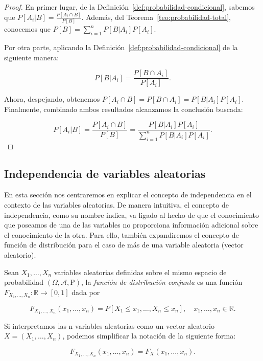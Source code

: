 \begin{proof}
    En primer lugar, de la Definición~\ref{def:probabilidad-condicional}, sabemos que
     $P[A_i|B] = \frac{P[A_i \cap B]}{P[B]}$. Además, del Teorema~\ref{teo:probabilidad-total}, conocemos que $P[B] = \sum_{i=1}^n P[B|A_i]P[A_i]$.\newline

    Por otra parte, aplicando la Definición~\ref{def:probabilidad-condicional} de la siguiente manera:

    \[ P[B|A_i] = \frac{P[B \cap A_i]}{P[A_i]}. \]\newline

    Ahora, despejando, obtenemos $P[A_i \cap B] = P[B \cap A_i] = P[B|A_i]{P[A_i]}$. Finalmente, combinado ambos resultados alcanzamos la conclusión buscada:

    \[ P[A_i|B] = \frac{P[A_i \cap B]}{P[B]} = \frac{P[B | A_i]P[A_i]}{\sum_{i=1}^n P[B|A_i]P[A_i]}. \]
    
\end{proof}

\subsection{Independencia de variables aleatorias}

En esta sección nos centraremos en explicar el concepto de independencia en el contexto de las variables aleatorias. De manera intuitiva, el concepto de independencia, como su nombre indica, va ligado al hecho de que el conocimiento que poseamos de una de las variables no proporciona información adicional sobre el conocimiento de la otra. Para ello, también expandiremos el concepto de función de distribución para el caso de más de una variable aleatoria (vector aleatorio).\newline

\begin{definicion}\label{def:funcion-de-distribucion-conjunta}
    Sean $X_1, \ldots, X_n$ variables aleatorias definidas sobre el mismo espacio de probabilidad $(\Omega, \mathcal{A}, \mathrm{P})$, la \emph{función de distribución conjunta} es una función $F_{X_{1}, \ldots, X_{n}}: \mathbb{R} \to [0,1]$ dada por

    \[ F_{X_{1}, \ldots, X_{n}}(x_1, \ldots, x_n) = P[X_1 \leq x_1, \ldots, X_n \leq x_n], \quad x_1, \ldots, x_n \in \mathbb{R}. \]

    Si interpretamos las n variables aleatorias como un vector aleatorio $X = (X_1, \ldots, X_n)$, podemos simplificar la notación de la siguiente forma:

    \[ F_{X_{1}, \ldots, X_{n}}(x_1, \ldots, x_n) = F_X(x_1, \ldots, x_n). \]\newline
\end{definicion}

